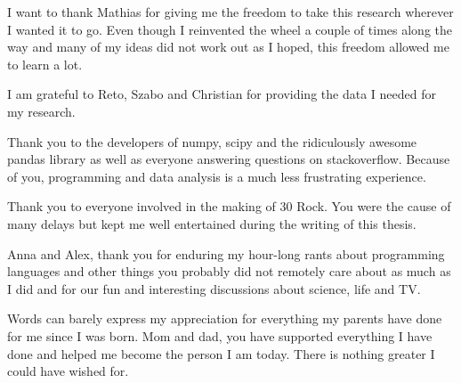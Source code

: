 I want to thank Mathias for giving me the freedom to take this research
wherever I wanted it to go. Even though I reinvented the wheel a couple of
times along the way and many of my ideas did not work out as I hoped, this
freedom allowed me to learn a lot.

I am grateful to Reto, Szabo and Christian for providing the data I needed for
my research.

Thank you to the developers of numpy, scipy and the ridiculously awesome pandas
library as well as everyone answering questions on stackoverflow. Because of
you, programming and data analysis is a much less frustrating experience.

Thank you to everyone involved in the making of 30 Rock. You were the cause of
many delays but kept me well entertained during the writing of this thesis.

Anna and Alex, thank you for enduring my hour-long rants about programming
languages and other things you probably did not remotely care about as much as
I did and for our fun and interesting discussions about science, life
and TV.

Words can barely express my appreciation for everything my parents have done
for me since I was born. Mom and dad, you have supported everything I have done
and helped me become the person I am today. There is nothing greater I could
have wished for.

